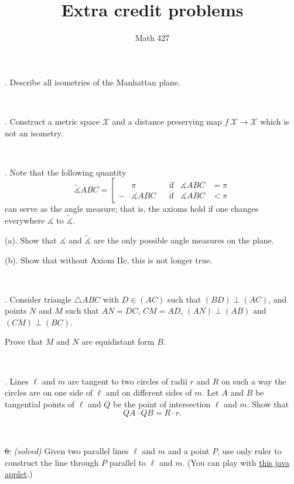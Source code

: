 \documentclass[oneside,a4paper]{article}
\begin{document}
%
\title{Extra credit problems}
\author{Math 427}
\date{}
\maketitle

\textit{}

. Describe all isometries of the Manhattan plane.

\ 

. Construct a metric space $\mathcal X$ and a distance preserving map $f\:\mathcal X\to \mathcal X$ which is not an isometry.

\ 

. Note that the following quantity 
$$\tilde
\measuredangle ABC=\left[
\begin{aligned}
&\pi&&\text{if}&\measuredangle ABC&=\pi
\\
-&\measuredangle ABC&&\text{if}&\measuredangle ABC&<\pi
\end{aligned}
\right.$$
can serve as the angle measure; 
that is, the axioms hold if one changes everywhere $\measuredangle$ to $\tilde\measuredangle$.

\noi (a). Show that $\measuredangle$ and $\tilde\measuredangle$ are the only possible angle measures on the plane. 

\noi (b). Show that without Axiom IIc, this is not longer true.


\ 

. Consider triangle $\triangle A B C$ with $D\in (A C)$ such that $(BD)\perp (AC)$, and points $N$ and $M$ such that $AN=DC$, $CM=AD$, $(AN)\perp(AB)$ and $(CM)\perp(BC)$.

Prove that $M$ and $N$ are equidistant form $B$. 

\ 



.  Lines $\ell$ and $m$ are tangent to two circles of radii $r$ and $R$ on such
a way the circles are on one side of $\ell$ and on different sides of $m$. 
Let $A$ and $B$ be
tangential points of $\ell$ and $Q$ be the point of intersection $\ell$ and $m$. 
Show that
$$QA\cdot QB = R\cdot r.$$

\ 

\noi \sout{6.} \textit{(solved)} Given two parallel lines $\ell$ and $m$ and a point $P$, use only ruler to construct the line through $P$ parallel to $\ell$ and $m$.
(You can play with \href{https://dl.dropboxusercontent.com/u/1577084/m427/car/3d-parallel.html}{this java applet}.)
\end{document}
